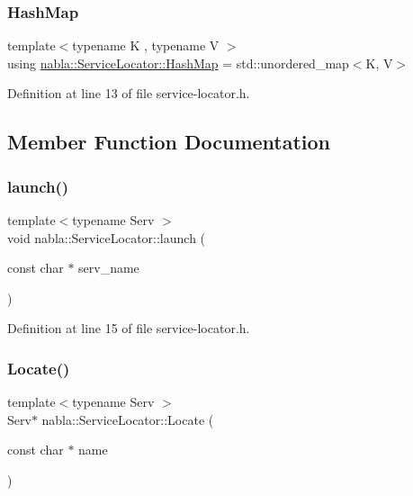 \subsubsection{\texorpdfstring{HashMap}{HashMap}}
{\footnotesize\ttfamily template$<$typename K , typename V $>$ \\
using \mbox{\hyperlink{classnabla_1_1_service_locator_a42756b69c11c011fe507276d9a506d1b}{nabla\+::\+Service\+Locator\+::\+Hash\+Map}} =  std\+::unordered\+\_\+map$<$K, V$>$}



Definition at line 13 of file service-\/locator.\+h.



\subsection{Member Function Documentation}
\mbox{\label{classnabla_1_1_service_locator_afe958b541a63a56d7d32e563332b31bb}} 
\subsubsection{\texorpdfstring{launch()}{launch()}}
{\footnotesize\ttfamily template$<$typename Serv $>$ \\
void nabla\+::\+Service\+Locator\+::launch (\begin{DoxyParamCaption}\item[{const char $\ast$}]{serv\+\_\+name }\end{DoxyParamCaption})\hspace{0.3cm}{\ttfamily [inline]}}



Definition at line 15 of file service-\/locator.\+h.

\mbox{\label{classnabla_1_1_service_locator_ad9d11cf92529d1f28388b20cc820e92c}} 
\subsubsection{\texorpdfstring{Locate()}{Locate()}}
{\footnotesize\ttfamily template$<$typename Serv $>$ \\
Serv$\ast$ nabla\+::\+Service\+Locator\+::\+Locate (\begin{DoxyParamCaption}\item[{const char $\ast$}]{name }\end{DoxyParamCaption})\hspace{0.3cm}{\ttfamily [inline]}}



